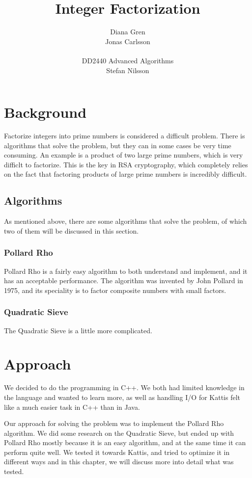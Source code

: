 \documentclass[a4paper, 12pt]{report}
\title{Integer Factorization}
\author{Diana Gren \\ Jonas Carlsson \\\\ DD2440 Advanced Algorithms \\ Stefan Nilsson}
\date{}
\begin{document}
\maketitle
\tableofcontents
\newpage
\chapter{Background}
Factorize integers into prime numbers is considered a difficult problem. There is algorithms that solve the problem, but they can in some cases be very time consuming. An example is a product of two large prime numbers, which is very difficlt to factorize. This is the key in RSA cryptography, which completely relies on the fact that factoring products of large prime numbers is incredibly difficult.

\section{Algorithms}
As mentioned above, there are some algorithms that solve the problem, of which two of them will be discussed in this section.

\subsection{Pollard Rho}
Pollard Rho is a fairly easy algorithm to both understand and implement, and it has an acceptable performance. The algorithm was invented by John Pollard in 1975, and its speciality is to factor composite numbers with small factors.

\subsection{Quadratic Sieve}
The Quadratic Sieve is a little more complicated.

\chapter{Approach}
We decided to do the programming in C++. We both had limited knowledge in the language and wanted to learn more, as well as handling I/O for Kattis felt like a much easier task in C++ than in Java. 

Our approach for solving the problem was to implement the Pollard Rho algorithm. We did some research on the Quadratic Sieve, but ended up with Pollard Rho mostly because it is an easy algorithm, and at the same time it can perform quite well. We tested it towards Kattis, and tried to optimize it in different ways and in this chapter, we will discuss more into detail what was tested.
\end{document}
